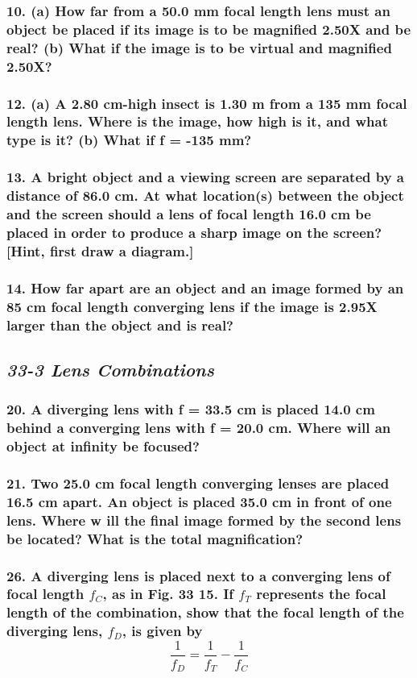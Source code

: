 \documentclass{article}
\begin{document}
\subsubsection*{
    10. (a) How far from a 50.0 mm focal length lens must an object be placed if its image
    is to be magnified 2.50X and be real? (b) What if the image is to be virtual and magnified 2.50X?
}
\subsubsection*{
    12. (a) A 2.80 cm-high insect is 1.30 m from a 135 mm focal length lens. Where is the image,
    how high is it, and what type is it? (b) What if f = -135 mm?
}
\subsubsection*{
    13. A bright object and a viewing screen are separated by a distance of 86.0 cm. At what location(s)
    between the object and the screen should a lens of focal length 16.0 cm be placed in order to produce
    a sharp image on the screen? [Hint, first draw a diagram.]
}
\subsubsection*{
    14. How far apart are an object and an image formed by an 85 cm focal length converging lens if the
    image is 2.95X larger than the object and is real?
}
\newpage
\begin{center}
    \subsection*{\textbf{\textit{33-3 Lens Combinations}}}
\end{center}
\subsubsection*{
    20. A diverging lens with f = 33.5 cm is placed 14.0 cm behind a converging lens with f = 20.0 cm.
    Where will an object at infinity be focused?
}
\subsubsection*{
    21. Two 25.0 cm focal length converging lenses are placed 16.5 cm apart. An object is placed 35.0 cm
    in front of one lens. Where w ill the final image formed by the second lens be located? What is the
    total magnification?
}
\subsubsection*{
    26. A diverging lens is placed next to a converging lens of
focal length $f_C$, as in Fig. 33 15. If $f_T$ represents the focal
length of the combination, show that the focal length of the
diverging lens, $f_D$, is given by
\[
    \displaystyle\frac{1}{f_D} = \displaystyle\frac{1}{f_T} -
    \displaystyle\frac{1}{f_C}
\]
}
\end{document}
